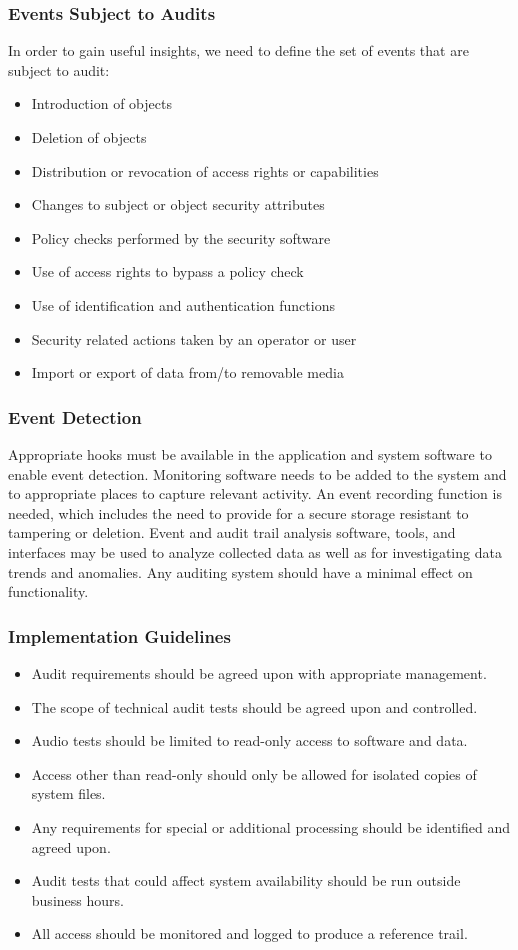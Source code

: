 \documentclass{math}
\begin{document}
\subsubsection*{Events Subject to Audits}
In order to gain useful insights, we need to define the set of events that are
subject to audit:
\begin{itemize}
  \item Introduction of objects
  \item Deletion of objects
  \item Distribution or revocation of access rights or capabilities
  \item Changes to subject or object security attributes
  \item Policy checks performed by the security software
  \item Use of access rights to bypass a policy check
  \item Use of identification and authentication functions
  \item Security related actions taken by an operator or user
  \item Import or export of data from/to removable media
\end{itemize}

\subsubsection*{Event Detection}
Appropriate hooks must be available in the application and system software to
enable event detection. Monitoring software needs to be added to the system and
to appropriate places to capture relevant activity. An event recording function
is needed, which includes the need to provide for a secure storage resistant to
tampering or deletion. Event and audit trail analysis software, tools, and
interfaces may be used to analyze collected data as well as for investigating
data trends and anomalies. Any auditing system should have a minimal effect on
functionality.

\subsubsection*{Implementation Guidelines}
\begin{itemize}
  \item Audit requirements should be agreed upon with appropriate management.
  \item The scope of technical audit tests should be agreed upon and controlled.
  \item Audio tests should be limited to read-only access to software and data.
  \item Access other than read-only should only be allowed for isolated copies
  of system files.
  \item Any requirements for special or additional processing should be
  identified and agreed upon.
  \item Audit tests that could affect system availability should be run outside
  business hours.
  \item All access should be monitored and logged to produce a reference trail.
\end{itemize}
\end{document}
